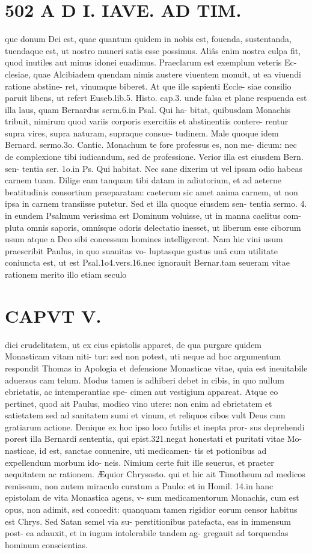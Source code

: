 \documentclass{article}
\begin{document}
\begin{pages}
\section*{502 A D I. IAVE. AD TIM. }que donum Dei est, quae quantum quidem in nobis est, fouenda, sustentanda, tuendaque est, ut nostro muneri satis esse possimus. Aliâs enim nostra culpa fit, quod inutiles aut minus idonei euadimus. Praeclarum est exemplum veteris Ec- clesiae, quae Alcibiadem quendam nimis austere viuentem monuit, ut ea viuendi ratione abstine- ret, vinumque biberet. At que ille sapienti Eccle- siae consilio paruit libens, ut refert Euseb.lib.5. Histo. cap.3. unde falsa et plane respuenda est illa laus, quam Bernardus serm.6.in Psal. Qui ha- bitat, quibusdam Monachis tribuit, nimirum quod variis corporis exercitiis et abstinentiis contere- rentur supra vires, supra naturam, supraque consue- tudinem. Male quoque idem Bernard. sermo.3o. Cantic. Monachum te fore professus es, non me- dicum: nec de complexione tibi iudicandum, sed de professione. Verior illa est eiusdem Bern. sen- tentia ser. 1o.in Ps. Qui habitat. Nec sane dixerim ut vel ipsam odio habeas carnem tuam. Dilige eam tanquam tibi datam in adiutorium, et ad aeterne beatitudinis consortium praeparatam: caeterum sic amet anima carnem, ut non ipsa in carnem transiisse putetur. Sed et illa quoque eiusdem sen- tentia sermo. 4. in eundem Psalmum verissima est Dominum voluisse, ut in manna caelitus com- pluta omnis saporis, omnísque odoris delectatio inesset, ut liberum esse ciborum usum atque a Deo sibi concessum homines intelligerent. Nam hic vini usum praescribit Paulus, in quo suauitas vo- luptasque gustus unâ cum utilitate coniuncta est, ut est Psal.1o4.vers.16.nec ignorauit Bernar.tam seueram vitae rationem merito illo etiam seculo 
\section*{CAPVT V. }
\marginpar{[ p.383 ]}dici crudelitatem, ut ex eius epistolis apparet, de qua purgare quidem Monasticam vitam niti- tur: sed non potest, uti neque ad hoc argumentum respondit Thomas in Apologia et defensione Monasticae vitae, quia est ineuitabile aduersus cam telum. Modus tamen is adhiberi debet in cibis, in quo nullum ebrietatis, ac intemperantiae spe- cimen aut vestigium appareat. Atque eo pertinet, quod ait Paulus, modieo vino utere: non enim ad ebrietatem et satietatem sed ad sanitatem sumi et vinum, et reliquos cibos vult Deus cum gratiarum actione. Denique ex hoc ipso loco futilis et inepta pror- sus deprehendi porest illa Bernardi sententia, qui epist.321.negat honestati et puritati vitae Mo- nasticae, id est, sanctae conuenire, uti medicamen- tis et potionibus ad expellendum morbum ido- neis. Nimium certe fuit ille seuerus, et praeter aequitatem ac rationem. Æquior Chrysosto. qui et hic ait Timotheum ad medicos remissum, non autem miraculo curatum a Paulo: et in Homil. 14.in hanc epistolam de vita Monastica agens, v- sum medicamentorum Monachis, cum est opus, non adimit, sed concedit: quanquam tamen rigidior eorum censor habitus est Chrys. Sed Satan semel via su- perstitionibus patefacta, eas in immensum post- ea adauxit, et in iugum intolerabile tandem ag- gregauit ad torquendas hominum conscientias.    

\end{pages}
\end{document}

